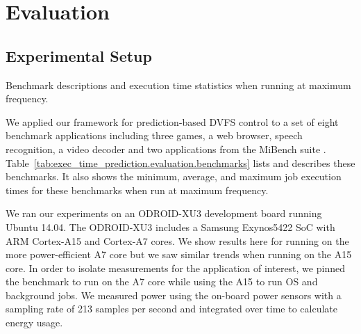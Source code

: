 \section{Evaluation}
\label{sec:exec_time_prediction.evaluation}

\subsection{Experimental Setup}
\label{sec:exec_time_prediction.evaluation.setup}

\begin{table}
  \begin{center}
    \begin{small}
    
    \end{small}
    \caption{Benchmark descriptions and execution time statistics when running
    at maximum frequency.}
    \label{tab:exec_time_prediction.evaluation.benchmarks}
  \end{center}
\end{table}

We applied our framework for prediction-based DVFS control to a set of eight
benchmark applications including three games, a web browser, speech
recognition, a video decoder and two applications from the MiBench suite
\cite{mibench}.  Table~\ref{tab:exec_time_prediction.evaluation.benchmarks}
lists and describes these benchmarks.  It also shows the minimum, average, and
maximum job execution times for these benchmarks when run at maximum frequency.

We ran our experiments on an ODROID-XU3 \cite{odroid} development board running
Ubuntu 14.04. The ODROID-XU3 includes a Samsung Exynos5422 SoC with ARM
Cortex-A15 and Cortex-A7 cores. We show results here for running on the more
power-efficient A7 core but we saw similar trends when running on the A15 core.
In order to isolate measurements for the application of interest, we pinned the
benchmark to run on the A7 core while using the A15 to run OS and background
jobs. We measured power using the on-board power sensors with a sampling rate
of 213 samples per second and integrated over time to calculate energy usage.


